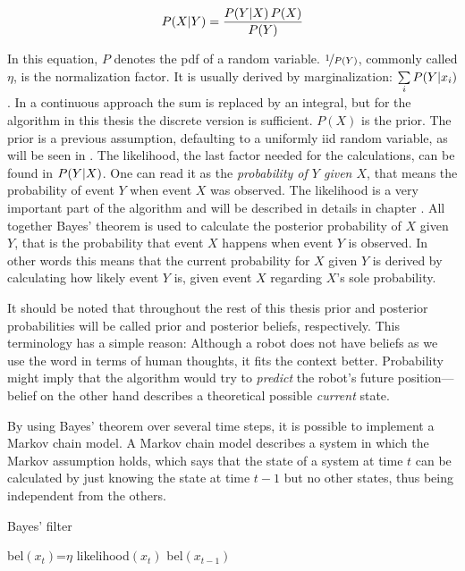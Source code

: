 \documentclass[Thesis.tex]{subfiles}
\begin{document}
\begin{align}
\p[P]{X}{Y} = \frac{ \p[P]{Y}{X} P(X) } { P(Y) }
\end{align}

In this equation, $P$ denotes the \gls{pdf} of a random variable. $\nicefrac{1}{P(Y)}$, commonly called $\eta$, is the normalization factor. It is usually derived by marginalization: $\sum\limits_i \p[P]{Y}{x_i}$. In a continuous approach the sum is replaced by an integral, but for the algorithm in this thesis the discrete version is sufficient. $P(X)$ is the prior. The prior is a previous assumption, defaulting to a uniformly \gls{iid} random variable, as will be seen in . The likelihood, the last factor needed for the calculations, can be found in $\p[P]{Y}{X}$. One can read it as the \emph{probability of $Y$ given $X$}, that means the probability of event $Y$ when event $X$ was observed. 
The likelihood is a very important part of the algorithm and will be described in details in chapter . All together Bayes' theorem is used to calculate the posterior probability of $X$ given $Y$, that is the probability that event $X$ happens when event $Y$ is observed. In other words this means that the current probability for $X$ given $Y$ is derived by calculating how likely event $Y$ is, given event $X$ regarding $X$'s sole probability. 

It should be noted that throughout the rest of this thesis prior and posterior probabilities will be called prior and posterior beliefs, respectively. This terminology has a simple reason: Although a robot does not have beliefs as we use the word in terms of human thoughts, it fits the context better. Probability might imply that the algorithm would try to \emph{predict} the robot's future position---belief on the other hand describes a theoretical possible \emph{current} state.

\bigskip

By using Bayes' theorem over several time steps, it is possible to implement a Markov chain model. A Markov chain model describes a system in which the Markov assumption holds, which says that the state of a system at time $t$ can be calculated by just knowing the state at time $t-1$ but no other states, thus being independent from the others.

\begin{algorithm}
\caption{Bayes' filter}
\label{alg:bayesfilter}

\bayesfilter{} {
   {
    bel$(x_t)$=$\eta$ likelihood$(x_t)$ bel$(x_{t-1})$\;
  }
}
\end{algorithm}
\end{document}
